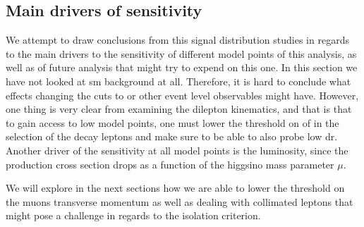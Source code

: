 \subsection{Main drivers of sensitivity}

We attempt to draw conclusions from this signal distribution studies in regards to the main drivers to the sensitivity of different model points of this analysis, as well as of future analysis that might try to expend on this one. In this section we have not looked at \gls{sm} background at all. Therefore, it is hard to conclude what effects changing the cuts to \MET or other event level observables might have. However, one thing is very clear from examining the dilepton kinematics, and that is that to gain access to low \dm model points, one must lower the threshold on of \pt in the selection of the decay leptons and make sure to be able to also probe low \gls{dr}. Another driver of the sensitivity at all \dm model points is the luminosity, since the production cross section drops as a function of the higgsino mass parameter $\mu$.

We will explore in the next sections how we are able to lower the threshold on the muons transverse momentum as well as dealing with collimated leptons that might pose a challenge in regards to the isolation criterion.